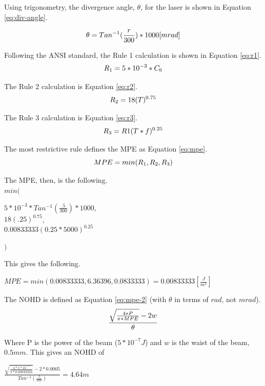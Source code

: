 \documentclass[letterpaper,10pt]{article}
\begin{document}
\begin{spacing}{1.15}
 Using trigonometry, the divergence angle, $\theta$, for the laser is shown in Equation \ref{eq:div-angle}.
 
 \begin{equation}\label{eq:div-angle} \large
 \theta = Tan^{-1}(\frac{r}{300})* 1000 [mrad]
 \end{equation}
 
 Following the ANSI standard, the Rule 1 calculation is shown in Equation \ref{eq:r1}.
 \begin{equation}\label{eq:r1}
 \large
 R_1 = 5*10^{-3} * C_6
 \end{equation}
 
 The Rule 2 calculation is Equation \ref{eq:r2}.
 \begin{equation}\label{eq:r2}
 \large
 R_2 = 18 (T)^{0.75}
 \end{equation}
 
 The Rule 3 calculation is Equation \ref{eq:r3}.
 \begin{equation} \label{eq:r3}
 \large
 R_3 = R1(T*f)^{0.25}
 \end{equation}
 
 The most restrictive rule defines the MPE as Equation \ref{eq:mpe}.
 \begin{equation}  \label{eq:mpe}
 \large
 MPE = min(R_1, R_2, R_3)
 \end{equation}
 
 The MPE, then, is the following.\\
 {\large $min($}
 \begin{center}
 	\large
 	$5*10^{-3} * Tan^{-1}(\frac{.5}{300})* 1000$,\\
 	$18 (.25)^{0.75}$,\\
 	$0.00833333 (0.25*5000)^{0.25}$
 \end{center}
 {\large $)$}
 
 This gives the following.
 \begin{center}
 	\large
 	$MPE = min(0.00833333, 6.36396, 0.0833333) = 0.00833333 [\frac{J}{m^2}]$
 \end{center}
 
 The NOHD is defined as Equation \ref{eq:mpe-2} (with $\theta$ in terms of $rad$, not $mrad$).
 \begin{equation} \large \label{eq:mpe-2}
 \frac{\sqrt{\frac{4 * P}{\pi * MPE}} - 2w}{\theta}
 \end{equation}
 
 Where P is the power of the beam ($5*10^{-7} J$) and $w$ is the waist of the beam, $0.5mm$. This gives an NOHD of 
 \begin{center}
 	\large
 	$ \frac{\sqrt{\frac{4 * 5*10^{-7} }{\pi * 0.00833333}} - 2*0.0005}{Tan^{-1}(\frac{.5}{300})} = 4.64m$
 \end{center}
 

\end{spacing}
\end{document}
